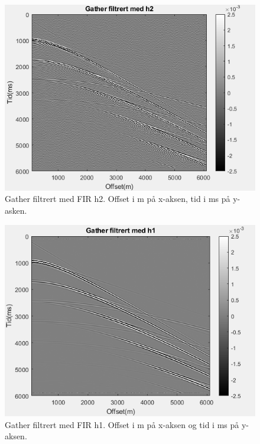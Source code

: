 \documentclass[11pt]{article}
\begin{document}
\begin{figure}[H]
\includegraphics[scale=0.9]{2c_h2filter.png}
\caption{Gather filtrert med FIR h2. Offset i m på x-aksen, tid i ms på y-asken.}
\end{figure}

\begin{figure}[H]
\includegraphics[scale=0.9]{2c_h1filter.png}
\caption{Gather filtrert med FIR h1. Offset i m på x-aksen og tid i ms på y-aksen.}
\end{figure}
\end{document}
